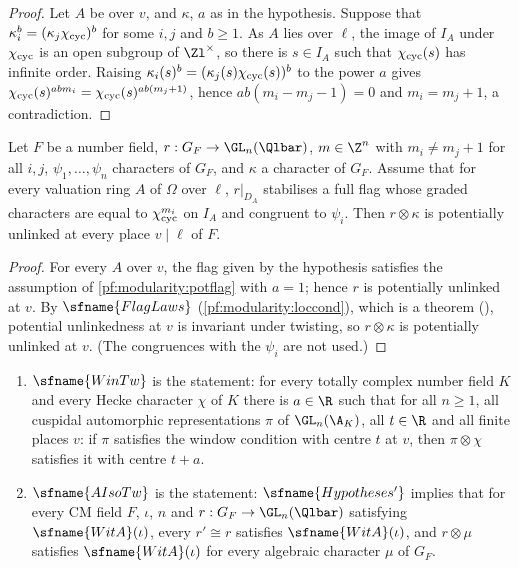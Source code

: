 \begin{proof}
Let $A$ be over $v$, and $\kappa$, $a$ as in the hypothesis. Suppose that $\kappa_i^b=(\kappa_j\chi_{\mathrm{cyc}})^b$ for some
$i,j$ and $b\ge1$. As $A$ lies over $\ell$, the image of $I_A$ under $\chi_{\mathrm{cyc}}$ is an open subgroup of $\Zl^\times$,
so there is $s\in I_A$ such that $\chi_{\mathrm{cyc}}(s)$ has infinite order. Raising
$\kappa_i(s)^b=(\kappa_j(s)\chi_{\mathrm{cyc}}(s))^b$ to the power $a$ gives
$\chi_{\mathrm{cyc}}(s)^{abm_i}=\chi_{\mathrm{cyc}}(s)^{ab(m_j+1)}$, hence $ab(m_i-m_j-1)=0$ and $m_i=m_j+1$, a contradiction.
\end{proof}

\begin{lemma}\label{pf:modularity:potord}
Let $F$ be a number field, $r:G_F\to\GL_n(\Qlbar)$, $m\in\Z^n$ with $m_i\ne m_j+1$ for all $i,j$, $\psi_1,\dots,\psi_n$
characters of $G_F$, and $\kappa$ a character of $G_F$. Assume that for every valuation ring $A$ of $\Omega$ over $\ell$,
$r|_{D_A}$ stabilises a full flag whose graded characters are equal to $\chi_{\mathrm{cyc}}^{m_i}$ on $I_A$ and congruent to
$\psi_i$. Then $r\otimes\kappa$ is potentially unlinked at every place $v\mid\ell$ of $F$.
\end{lemma}

\begin{proof}
For every $A$ over $v$, the flag given by the hypothesis satisfies the assumption of \cref{pf:modularity:potflag} with
$a=1$; hence $r$ is potentially unlinked at $v$. By $\sfname{FlagLaws}$ (\cref{pf:modularity:loccond}), which is a theorem
(), potential unlinkedness at $v$ is invariant under twisting, so $r\otimes\kappa$ is
potentially unlinked at $v$. (The congruences with the $\psi_i$ are not used.)
\end{proof}

\begin{definition}\label{pf:modularity:wintw}
\begin{enumerate}[label=(\alph*)]
\item $\sfname{WinTw}$ is the statement: for every totally complex number field $K$ and every Hecke character $\chi$ of $K$
there is $a\in\R$ such that for all $n\ge1$, all cuspidal automorphic representations $\pi$ of $\GL_n(\A_K)$, all $t\in\R$
and all finite places $v$: if $\pi$ satisfies the window condition with centre $t$ at $v$, then $\pi\otimes\chi$ satisfies
it with centre $t+a$.
\item $\sfname{AIsoTw}$ is the statement: $\sfname{Hypotheses'}$ implies that for every CM field $F$, $\iota$, $n$ and
$r:G_F\to\GL_n(\Qlbar)$ satisfying $\sfname{WitA}(\iota)$, every $r'\cong r$ satisfies $\sfname{WitA}(\iota)$, and
$r\otimes\mu$ satisfies $\sfname{WitA}(\iota)$ for every algebraic character $\mu$ of $G_F$.
\end{enumerate}
\end{definition}

